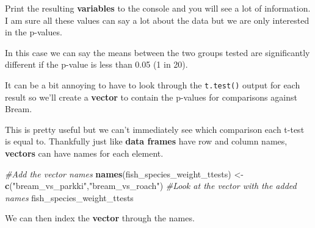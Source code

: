 \documentclass[]{book}
\newenvironment{Shaded}{\begin{snugshade}}{\end{snugshade}}
\newcommand{\KeywordTok}[1]{\textcolor[rgb]{0.13,0.29,0.53}{\textbf{#1}}}
\newcommand{\StringTok}[1]{\textcolor[rgb]{0.31,0.60,0.02}{#1}}
\newcommand{\CommentTok}[1]{\textcolor[rgb]{0.56,0.35,0.01}{\textit{#1}}}
\newcommand{\OperatorTok}[1]{\textcolor[rgb]{0.81,0.36,0.00}{\textbf{#1}}}
\newcommand{\NormalTok}[1]{#1}
\begin{document}
Print the resulting \textbf{variables} to the console and you will see a
lot of information. I am sure all these values can say a lot about the
data but we are only interested in the p-values.

In this case we can say the means between the two groups tested are
significantly different if the p-value is less than 0.05 (1 in 20).

It can be a bit annoying to have to look through the \texttt{t.test()}
output for each result so we'll create a \textbf{vector} to contain the
p-values for comparisons against Bream.

\begin{Shaded}
\end{Shaded}

This is pretty useful but we can't immediately see which comparison each
t-test is equal to. Thankfully just like \textbf{data frames} have row
and column names, \textbf{vectors} can have names for each element.

\begin{Shaded}
\begin{Highlighting}[]
\CommentTok{#Add the vector names}
\KeywordTok{names}\NormalTok{(fish_species_weight_ttests) <-}\StringTok{ }
\StringTok{  }\KeywordTok{c}\NormalTok{(}\StringTok{"bream_vs_parkki"}\NormalTok{,}\StringTok{"bream_vs_roach"}\NormalTok{)}
\CommentTok{#Look at the vector with the added names}
\NormalTok{fish_species_weight_ttests}
\end{Highlighting}
\end{Shaded}

We can then index the \textbf{vector} through the names.

\begin{Shaded}
\end{Shaded}
\end{document}
